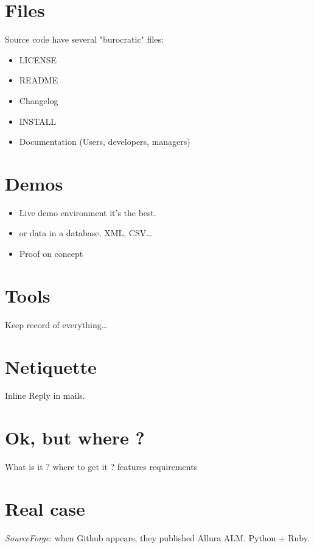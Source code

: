 \documentclass[11pt]{scrartcl}
\begin{document}
\section{Files}

Source code have several "burocratic" files:
\begin{itemize}
	\item LICENSE
	\item README
	\item Changelog
	\item INSTALL
	\item Documentation (Users, developers, managers)
\end{itemize}

\section{Demos}

\begin{itemize}
	\item Live demo environment it's the best.
	\item or data in a database, XML, CSV\ldots
	\item Proof on concept
\end{itemize}

\section{Tools}
\label{sec:tools}

Keep record of everything\ldots

\section{Netiquette}


Inline Reply in mails.
\section{Ok, but where ?}
\label{sec:ok-but}

What is it ?
where to get it ? 
features
requirements

\section{Real case}

\emph{SourceForge}: when Github appears, they published Allura ALM. Python + Ruby.
\end{document}
